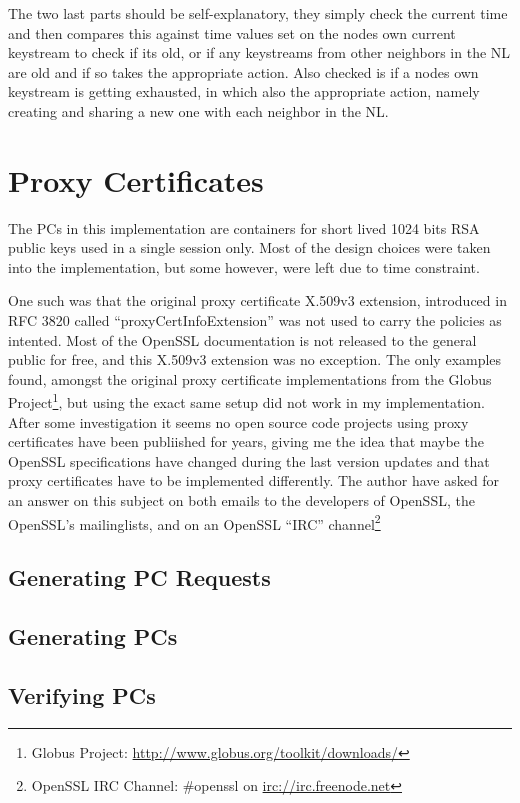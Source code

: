 The two last parts should be self-explanatory, they simply check the current
time and then compares this against time values set on the nodes own current
keystream to check if its old, or if any keystreams from other neighbors in the
\ac{NL} are old and if so takes the appropriate action. Also checked is if a
nodes own keystream is getting exhausted, in which also the appropriate action,
namely creating and sharing a new one with each neighbor in the \ac{NL}.


\section{Proxy Certificates}
The \acp{PC} in this implementation are containers for short lived 1024 bits RSA
public keys used in a single session only. Most of the design choices were taken
into the implementation, but some however, were left due to time constraint.

One such was that the original proxy certificate X.509v3 extension, introduced
in RFC 3820 called ``proxyCertInfoExtension'' was not used to carry the policies as
intented. Most of the OpenSSL documentation is not released to the general
public for free, and this X.509v3 extension was no exception. The only examples
found, amongst the original proxy certificate implementations from the Globus
Project\footnote{Globus Project:
\url{http://www.globus.org/toolkit/downloads/}}, but using the exact same setup
did not work in my implementation. After some investigation it seems no open
source code projects using proxy certificates have been publiished for years,
giving me the idea that maybe the OpenSSL specifications have changed during
the last version updates and that proxy certificates have to be implemented
differently. The author have asked for an answer on this subject on both emails
to the developers of OpenSSL, the OpenSSL's mailinglists, and on an
OpenSSL ``IRC'' channel\footnote{OpenSSL IRC Channel: \#openssl on
\url{irc://irc.freenode.net}}

\subsection{Generating PC Requests}
\subsection{Generating PCs}
\subsection{Verifying PCs}

